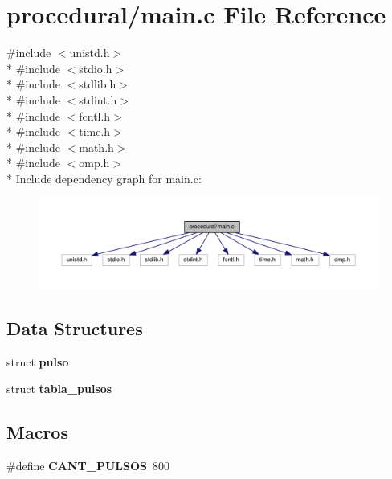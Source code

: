\section{procedural/main.c File Reference}
\label{procedural_2main_8c}
{\ttfamily \#include $<$unistd.\+h$>$}\\*
{\ttfamily \#include $<$stdio.\+h$>$}\\*
{\ttfamily \#include $<$stdlib.\+h$>$}\\*
{\ttfamily \#include $<$stdint.\+h$>$}\\*
{\ttfamily \#include $<$fcntl.\+h$>$}\\*
{\ttfamily \#include $<$time.\+h$>$}\\*
{\ttfamily \#include $<$math.\+h$>$}\\*
{\ttfamily \#include $<$omp.\+h$>$}\\*
Include dependency graph for main.\+c\+:
\nopagebreak
\begin{figure}[H]
\begin{center}
\leavevmode
\includegraphics[width=350pt]{procedural_2main_8c__incl}
\end{center}
\end{figure}
\subsection*{Data Structures}
\begin{DoxyCompactItemize}
\item 
struct {\bf pulso}
\item 
struct {\bf tabla\+\_\+pulsos}
\end{DoxyCompactItemize}
\subsection*{Macros}
\begin{DoxyCompactItemize}
\item 
\#define {\bf C\+A\+N\+T\+\_\+\+P\+U\+L\+S\+OS}~800
\end{DoxyCompactItemize}
